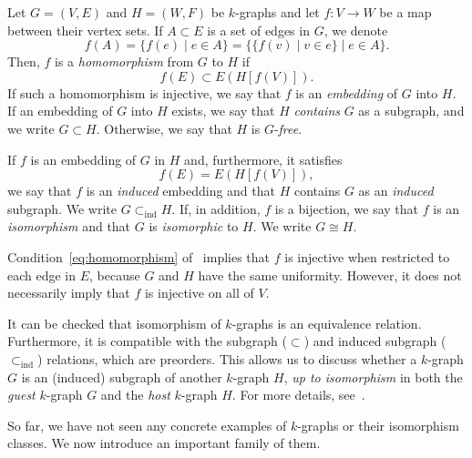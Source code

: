 \begin{definition} \label{def:embedding}
    Let $G = (V, E)$ and $H = (W, F)$ be $k$-graphs and let $f: V \to W$ be a map
    between their vertex sets.
    If $A \subset E$ is a set of edges in $G$, we denote
    \[
        f(A) = \{f(e) \mid e \in A\} = \{\{f(v) \mid v \in e\} \mid e \in A\}.
    \]
    Then, $f$ is a \emph{homomorphism} from $G$ to $H$ if
    \begin{equation}
        \label{eq:homomorphism}
        f(E) \subset E(H[f(V)]).
    \end{equation}
    If such a homomorphism is injective, we say that $f$
    is an \emph{embedding} of $G$ into $H$.
    If an embedding of $G$ into $H$ exists, we say that
    $H$ \emph{contains} $G$ as a subgraph,
    and we write $G \subset H$.
    Otherwise, we say that $H$ is $G$-\emph{free}.

    If $f$ is an embedding of $G$ in $H$ and, furthermore, it satisfies
    \begin{equation}
        \label{eq:induced_embedding}
        f(E) = E(H[f(V)]),
    \end{equation}
    we say that $f$ is an \emph{induced} embedding
    and that $H$ contains $G$ as an \emph{induced} subgraph.
    We write $G \subset_{\text{ind}} H$.
    If, in addition, $f$ is a bijection, we say that $f$ is an \emph{isomorphism}
    and that $G$ is \emph{isomorphic} to $H$.
    We write $G \cong H$.
\end{definition}

\begin{remark}
    Condition~\eqref{eq:homomorphism} of~
    implies that $f$ is injective
    when restricted to each edge in $E$, because $G$ and $H$ have the same uniformity.
    However, it does not necessarily imply that $f$ is injective on all of $V$.
\end{remark}

It can be checked that isomorphism of $k$-graphs is an equivalence relation.
Furthermore, it is compatible with the subgraph ($\subset$) and induced subgraph
($\subset_{\text{ind}}$) relations, which are preorders.
This allows us to discuss whether a $k$-graph $G$ is an (induced) subgraph of another $k$-graph $H$,
\emph{ up to isomorphism} in both the \emph{guest} $k$-graph $G$ and the \emph{host} $k$-graph $H$.
For more details, see~.

So far, we have not seen any concrete examples of $k$-graphs or their isomorphism classes.
We now introduce an important family of them.

